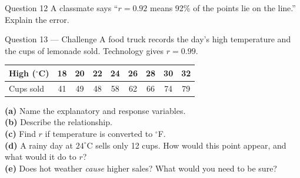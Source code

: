 \documentclass[11pt]{article}
\begin{document}
\begin{qbox}{Question 12}
A classmate says \textquotedblleft{}$r=0.92$ means 92\% of the points lie on the line.\textquotedblright{} Explain the error.\workspace{2.4cm}
\end{qbox}

\begin{qbox}{Question 13 --- Challenge}
A food truck records the day's high temperature and the cups of lemonade sold. Technology gives $r=0.99$.\begin{center}\footnotesize\begin{tabular}{|l|*{8}{c|}}\hline High ($^\circ$C) & 18 & 20 & 22 & 24 & 26 & 28 & 30 & 32 \\ \hline Cups sold & 41 & 49 & 48 & 58 & 62 & 66 & 74 & 79 \\ \hline\end{tabular}\end{center}\par\smallskip\textbf{(a)} Name the explanatory and response variables. \\ \textbf{(b)} Describe the relationship. \\ \textbf{(c)} Find $r$ if temperature is converted to $^\circ$F. \\ \textbf{(d)} A rainy day at $24^\circ$C sells only 12 cups. How would this point appear, and what would it do to $r$? \\ \textbf{(e)} Does hot weather \emph{cause} higher sales? What would you need to be sure?\workspace{6.5cm}
\end{qbox}

\clearpage
{}
\end{document}
